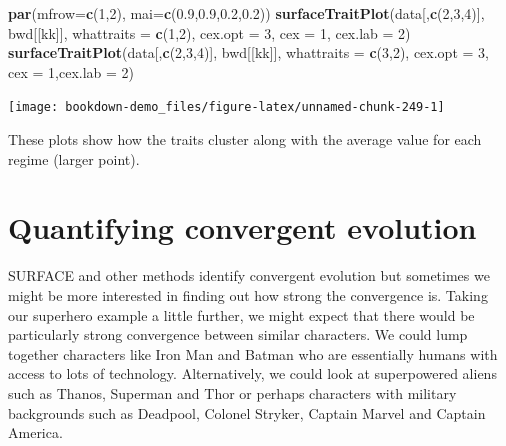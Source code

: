 \documentclass[
]{book}
\newenvironment{Shaded}{\begin{snugshade}}{\end{snugshade}}
\newcommand{\DataTypeTok}[1]{\textcolor[rgb]{0.13,0.29,0.53}{#1}}
\newcommand{\DecValTok}[1]{\textcolor[rgb]{0.00,0.00,0.81}{#1}}
\newcommand{\FloatTok}[1]{\textcolor[rgb]{0.00,0.00,0.81}{#1}}
\newcommand{\KeywordTok}[1]{\textcolor[rgb]{0.13,0.29,0.53}{\textbf{#1}}}
\newcommand{\NormalTok}[1]{#1}
\begin{document}
\begin{Shaded}
\begin{Highlighting}[]
\KeywordTok{par}\NormalTok{(}\DataTypeTok{mfrow=}\KeywordTok{c}\NormalTok{(}\DecValTok{1}\NormalTok{,}\DecValTok{2}\NormalTok{), }\DataTypeTok{mai=}\KeywordTok{c}\NormalTok{(}\FloatTok{0.9}\NormalTok{,}\FloatTok{0.9}\NormalTok{,}\FloatTok{0.2}\NormalTok{,}\FloatTok{0.2}\NormalTok{))}
\KeywordTok{surfaceTraitPlot}\NormalTok{(data[,}\KeywordTok{c}\NormalTok{(}\DecValTok{2}\NormalTok{,}\DecValTok{3}\NormalTok{,}\DecValTok{4}\NormalTok{)], bwd[[kk]], }\DataTypeTok{whattraits =} \KeywordTok{c}\NormalTok{(}\DecValTok{1}\NormalTok{,}\DecValTok{2}\NormalTok{),}
                 \DataTypeTok{cex.opt =} \DecValTok{3}\NormalTok{, }\DataTypeTok{cex =} \DecValTok{1}\NormalTok{, }\DataTypeTok{cex.lab =} \DecValTok{2}\NormalTok{)}
\KeywordTok{surfaceTraitPlot}\NormalTok{(data[,}\KeywordTok{c}\NormalTok{(}\DecValTok{2}\NormalTok{,}\DecValTok{3}\NormalTok{,}\DecValTok{4}\NormalTok{)], bwd[[kk]], }\DataTypeTok{whattraits =} \KeywordTok{c}\NormalTok{(}\DecValTok{3}\NormalTok{,}\DecValTok{2}\NormalTok{),  }
                 \DataTypeTok{cex.opt =} \DecValTok{3}\NormalTok{, }\DataTypeTok{cex =} \DecValTok{1}\NormalTok{,}\DataTypeTok{cex.lab =} \DecValTok{2}\NormalTok{)}
\end{Highlighting}
\end{Shaded}

\begin{center}\texttt{[image: bookdown-demo\_files/figure-latex/unnamed-chunk-249-1]} \end{center}

These plots show how the traits cluster along with the average value for each regime (larger point).

\hypertarget{quantifying-convergent-evolution}{%
\section{Quantifying convergent evolution}\label{quantifying-convergent-evolution}}

SURFACE and other methods identify convergent evolution but sometimes we might be more interested in finding out how strong the convergence is. Taking our superhero example a little further, we might expect that there would be particularly strong convergence between similar characters. We could lump together characters like Iron Man and Batman who are essentially humans with access to lots of technology. Alternatively, we could look at superpowered aliens such as Thanos, Superman and Thor or perhaps characters with military backgrounds such as Deadpool, Colonel Stryker, Captain Marvel and Captain America.
\end{document}
